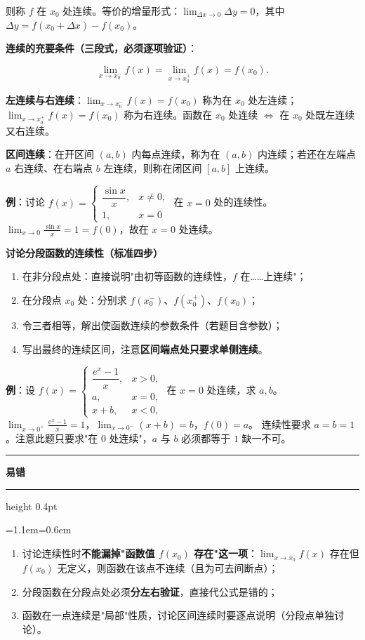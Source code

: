 \documentclass[11pt,openany,UTF8]{ctexbook}
\newcommand{\callouthead}[2]{%
  \par\addvspace{7pt}\noindent
  {\color{#1}\rule[-0.15em]{3pt}{1.05em}}\hspace{0.5em}%
  {\bfseries\color{#1}#2}\par\nobreak\vspace{-0.35em}%
  {\color{rulesep}\hrule height 0.4pt}\nobreak\vspace{0.45em}%
  \begingroup\small\setlength{\parindent}{0pt}%
  \leftskip=1.1em\rightskip=0.6em\noindent\ignorespaces}
\newcommand{\calloutend}{\par\endgroup\addvspace{7pt}}
\newenvironment{callwarn}[1]{\callouthead{warnbar}{#1}}{\calloutend}
\begin{document}
则称 $f$ 在 $x_0$ 处连续。等价的增量形式：$\lim_{\Delta x\to 0}\Delta y=0$，其中 $\Delta y=f(x_0+\Delta x)-f(x_0)$。

\textbf{连续的充要条件（三段式，必须逐项验证）}：

\[\lim_{x\to x_0^-}f(x)=\lim_{x\to x_0^+}f(x)=f(x_0).\]

\textbf{左连续与右连续}：$\lim_{x\to x_0^-}f(x)=f(x_0)$ 称为在 $x_0$ 处左连续；$\lim_{x\to x_0^+}f(x)=f(x_0)$ 称为右连续。函数在 $x_0$ 处连续 $\iff$ 在 $x_0$ 处既左连续又右连续。

\textbf{区间连续}：在开区间 $(a,b)$ 内每点连续，称为在 $(a,b)$ 内连续；若还在左端点 $a$ 右连续、在右端点 $b$ 左连续，则称在闭区间 $[a,b]$ 上连续。

\textbf{例}：讨论 $f(x)=\begin{cases}\dfrac{\sin x}{x}, & x\ne 0,\\ 1, & x=0\end{cases}$ 在 $x=0$ 处的连续性。 $\lim_{x\to 0}\frac{\sin x}{x}=1=f(0)$，故在 $x=0$ 处连续。

\textbf{讨论分段函数的连续性（标准四步）}

\begin{enumerate}
\item 在非分段点处：直接说明"由初等函数的连续性，$f$ 在……上连续"；
\item 在分段点 $x_0$ 处：分别求 $f(x_0^-)$、$f(x_0^+)$、$f(x_0)$；
\item 令三者相等，解出使函数连续的参数条件（若题目含参数）；
\item 写出最终的连续区间，注意\textbf{区间端点处只要求单侧连续}。
\end{enumerate}
\textbf{例}：设 $f(x)=\begin{cases}\dfrac{e^{x}-1}{x}, & x>0,\\ a, & x=0,\\ x+b, & x<0,\end{cases}$ 在 $x=0$ 处连续，求 $a,b$。 $\lim_{x\to 0^+}\frac{e^{x}-1}{x}=1$，$\lim_{x\to 0^-}(x+b)=b$，$f(0)=a$。 连续性要求 $a=b=1$。注意此题只要求"在 0 处连续"，$a$ 与 $b$ 必须都等于 $1$ 缺一不可。

\begin{callwarn}{易错}
\begin{enumerate}
\item 讨论连续性时\textbf{不能漏掉"函数值 $f(x_0)$ 存在"这一项}：$\lim_{x\to x_0}f(x)$ 存在但 $f(x_0)$ 无定义，则函数在该点不连续（且为可去间断点）；
\item 分段函数在分段点处必须\textbf{分左右验证}，直接代公式是错的；
\item 函数在一点连续是"局部"性质，讨论区间连续时要逐点说明（分段点单独讨论）。
\end{enumerate}
\end{callwarn}
\end{document}
